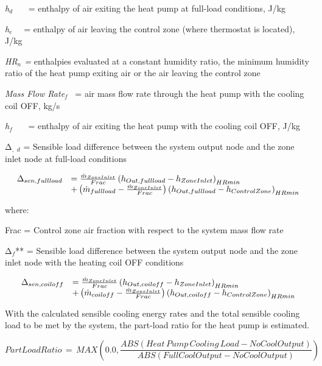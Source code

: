 \emph{h\(_{d}\)}~~~ = enthalpy of air exiting the heat pump at full-load conditions, J/kg

\emph{h\(_{e}\)}~~ = enthalpy of air leaving the control zone (where thermostat is located), J/kg

\emph{HR\(_{n}\) =} enthalpies evaluated at a constant humidity ratio, the minimum humidity ratio of the heat pump exiting air or the air leaving the control zone

\emph{Mass Flow Rate\(_{f}\)}~ = air mass flow rate through the heat pump with the cooling coil OFF, kg/s

\emph{h\(_{f}\)}~~~ = enthalpy of air exiting the heat pump with the cooling coil OFF, J/kg

Δ\(_{,}\) \emph{\(_{d}\)} = Sensible load difference between the system output node and the zone inlet node at full-load conditions

\begin{equation}
  \begin{array}{rl}
    \Delta_{sen,full load} &= \frac{\dot{m}_{ZoneInlet}}{Frac} \PB{h_{Out,full load} - h_{ZoneInlet}}_{HRmin} \\
                           &+ \PB{\dot{m}_{full load} - \frac{\dot{m}_{ZoneInlet}}{Frac}} \PB{h_{Out,full load} - h_{ControlZone}}_{HRmin}
  \end{array}
\end{equation}

where:

Frac = Control zone air fraction with respect to the system mass flow rate

Δ\(_{f}\)** = Sensible load difference between the system output node and the zone inlet node with the heating coil OFF conditions

\begin{equation}
  \begin{array}{rl}
    \Delta_{sen,coil off} &= \frac{\dot{m}_{ZoneInlet}}{Frac} \PB{h_{Out,coil off} - h_{ZoneInlet}}_{HRmin} \\
                           &+ \PB{\dot{m}_{coil off} - \frac{\dot{m}_{ZoneInlet}}{Frac}} \PB{h_{Out,coil off} - h_{ControlZone}}_{HRmin}
  \end{array}
\end{equation}

With the calculated sensible cooling energy rates and the total sensible cooling load to be met by the system, the part-load ratio for the heat pump is estimated.

\begin{equation}
PartLoadRatio\, = \,MAX\left( {0.0,\frac{{ABS\left( {Heat\,Pump\,Cooling\,Load - NoCoolOutput} \right)}}{{ABS\left( {FullCoolOutput - NoCoolOutput} \right)}}} \right)
\end{equation}

